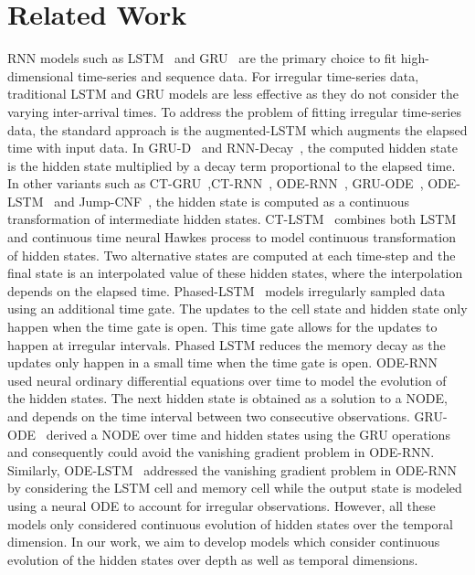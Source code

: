 \documentclass{article} %
\begin{document}
\section{Related Work} 
RNN models such as LSTM~\citep{lstm} and GRU~\citep{gru} are the primary choice to fit high-dimensional time-series and sequence data. For irregular time-series data, traditional LSTM and GRU models  are less effective as they do not consider the varying inter-arrival times. To address the problem of fitting irregular time-series data, the standard approach is the augmented-LSTM which augments the elapsed time with input data.  In GRU-D~\citep{grud} and RNN-Decay~\citep{rubanova2019latent}, the computed hidden state is the  hidden state multiplied by a decay term  proportional to the elapsed time.  In other variants such as CT-GRU~\citep{ctgru},CT-RNN~\citep{ctrnn}, ODE-RNN~\citep{rubanova2019latent}, GRU-ODE~\citep{de2019gru}, ODE-LSTM~\citep{lechner2020learning} and Jump-CNF~\citep{spatio-temp}, the hidden state is computed as a continuous transformation of intermediate hidden states. %
 CT-LSTM~\citep{ctlstm} combines both LSTM and continuous time neural Hawkes process to model continuous transformation of hidden states. Two alternative states are computed at each time-step and the final state is an interpolated value of these hidden states, where the interpolation depends on the elapsed time. Phased-LSTM~\citep{neil2016phased} models irregularly sampled data using  an additional time gate. The updates to the cell state and hidden state only happen when the time gate is open. 
 This time gate allows for the updates to happen at irregular intervals. Phased LSTM reduces the memory decay as the updates only happen in a small time when the time gate is open. ODE-RNN~\citep{rubanova2019latent} used neural ordinary differential equations over time to model the evolution of the hidden states. The next hidden state is obtained as a solution to a NODE, and depends on the time interval between two consecutive observations. GRU-ODE~\citep{de2019gru} derived a NODE over time and hidden states using the GRU operations and consequently could avoid the vanishing gradient problem in  ODE-RNN. Similarly, ODE-LSTM~\citep{lechner2020learning} addressed the vanishing gradient problem in  ODE-RNN by considering the LSTM cell and memory cell while  the output state is modeled using a neural ODE to account for irregular  observations. However, all these models only considered continuous evolution of hidden states over the temporal dimension.  In our work, we aim to develop models which consider continuous evolution of the hidden states over depth as well as temporal dimensions. 
\end{document}
